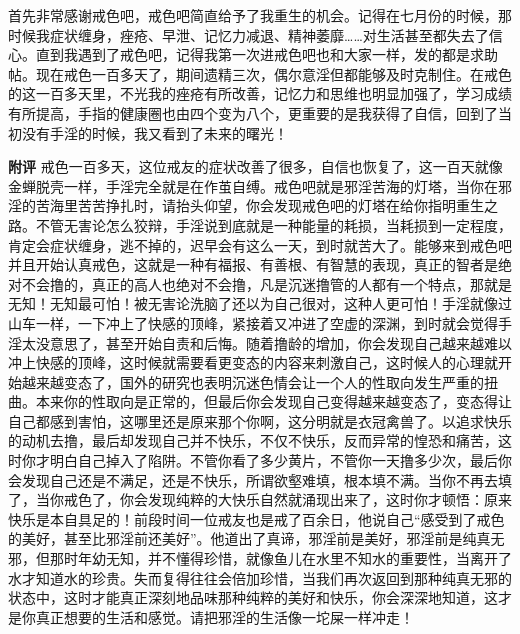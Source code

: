 \begin{case}
    首先非常感谢戒色吧，戒色吧简直给予了我重生的机会。记得在七月份的时候，那时候我症状缠身，痤疮、早泄、记忆力减退、精神萎靡……对生活甚至都失去了信心。直到我遇到了戒色吧，记得我第一次进戒色吧也和大家一样，发的都是求助帖。现在戒色一百多天了，期间遗精三次，偶尔意淫但都能够及时克制住。在戒色的这一百多天里，不光我的痤疮有所改善，记忆力和思维也明显加强了，学习成绩有所提高，手指的健康圈也由四个变为八个，更重要的是我获得了自信，回到了当初没有手淫的时候，我又看到了未来的曙光！

    \textbf{附评} 戒色一百多天，这位戒友的症状改善了很多，自信也恢复了，这一百天就像金蝉脱壳一样，手淫完全就是在作茧自缚。戒色吧就是邪淫苦海的灯塔，当你在邪淫的苦海里苦苦挣扎时，请抬头仰望，你会发现戒色吧的灯塔在给你指明重生之路。不管无害论怎么狡辩，手淫说到底就是一种能量的耗损，当耗损到一定程度，肯定会症状缠身，逃不掉的，迟早会有这么一天，到时就苦大了。能够来到戒色吧并且开始认真戒色，这就是一种有福报、有善根、有智慧的表现，真正的智者是绝对不会撸的，真正的高人也绝对不会撸，凡是沉迷撸管的人都有一个特点，那就是无知！无知最可怕！被无害论洗脑了还以为自己很对，这种人更可怕！手淫就像过山车一样，一下冲上了快感的顶峰，紧接着又冲进了空虚的深渊，到时就会觉得手淫太没意思了，甚至开始自责和后悔。随着撸龄的增加，你会发现自己越来越难以冲上快感的顶峰，这时候就需要看更变态的内容来刺激自己，这时候人的心理就开始越来越变态了，国外的研究也表明沉迷色情会让一个人的性取向发生严重的扭曲。本来你的性取向是正常的，但最后你会发现自己变得越来越变态了，变态得让自己都感到害怕，这哪里还是原来那个你啊，这分明就是衣冠禽兽了。以追求快乐的动机去撸，最后却发现自己并不快乐，不仅不快乐，反而异常的惶恐和痛苦，这时你才明白自己掉入了陷阱。不管你看了多少黄片，不管你一天撸多少次，最后你会发现自己还是不满足，还是不快乐，所谓欲壑难填，根本填不满。当你不再去填了，当你戒色了，你会发现纯粹的大快乐自然就涌现出来了，这时你才顿悟：原来快乐是本自具足的！前段时间一位戒友也是戒了百余日，他说自己“感受到了戒色的美好，甚至比邪淫前还美好”。他道出了真谛，邪淫前是美好，邪淫前是纯真无邪，但那时年幼无知，并不懂得珍惜，就像鱼儿在水里不知水的重要性，当离开了水才知道水的珍贵。失而复得往往会倍加珍惜，当我们再次返回到那种纯真无邪的状态中，这时才能真正深刻地品味那种纯粹的美好和快乐，你会深深地知道，这才是你真正想要的生活和感觉。请把邪淫的生活像一坨屎一样冲走！
\end{case}

